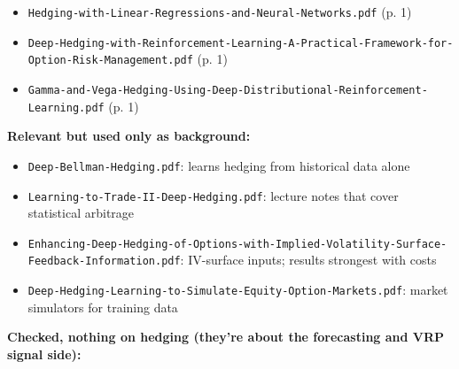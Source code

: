 \documentclass{article}
\begin{document}
\begin{itemize}
\item \texttt{Hedging-\allowbreak{}with-\allowbreak{}Linear-\allowbreak{}Regressions-\allowbreak{}and-\allowbreak{}Neural-\allowbreak{}Networks.\allowbreak{}pdf} (p. 1)

\item \texttt{Deep-\allowbreak{}Hedging-\allowbreak{}with-\allowbreak{}Reinforcement-\allowbreak{}Learning-\allowbreak{}A-\allowbreak{}Practical-\allowbreak{}Framework-\allowbreak{}for-\allowbreak{}Option-\allowbreak{}Risk-\allowbreak{}Management.\allowbreak{}pdf} (p. 1)

\item \texttt{Gamma-\allowbreak{}and-\allowbreak{}Vega-\allowbreak{}Hedging-\allowbreak{}Using-\allowbreak{}Deep-\allowbreak{}Distributional-\allowbreak{}Reinforcement-\allowbreak{}Learning.\allowbreak{}pdf} (p. 1)

\end{itemize}

\textbf{Relevant but used only as background:}

\begin{itemize}

\item \texttt{Deep-\allowbreak{}Bellman-\allowbreak{}Hedging.\allowbreak{}pdf}: learns hedging from historical data alone

\item \texttt{Learning-\allowbreak{}to-\allowbreak{}Trade-\allowbreak{}II-\allowbreak{}Deep-\allowbreak{}Hedging.\allowbreak{}pdf}: lecture notes that cover statistical arbitrage

\item \texttt{Enhancing-\allowbreak{}Deep-\allowbreak{}Hedging-\allowbreak{}of-\allowbreak{}Options-\allowbreak{}with-\allowbreak{}Implied-\allowbreak{}Volatility-\allowbreak{}Surface-\allowbreak{}Feedback-\allowbreak{}Information.\allowbreak{}pdf}: IV-surface inputs; results strongest with costs

\item \texttt{Deep-\allowbreak{}Hedging-\allowbreak{}Learning-\allowbreak{}to-\allowbreak{}Simulate-\allowbreak{}Equity-\allowbreak{}Option-\allowbreak{}Markets.\allowbreak{}pdf}: market simulators for training data

\end{itemize}

\textbf{Checked, nothing on hedging (they're about the forecasting and VRP signal side):}
\end{document}
